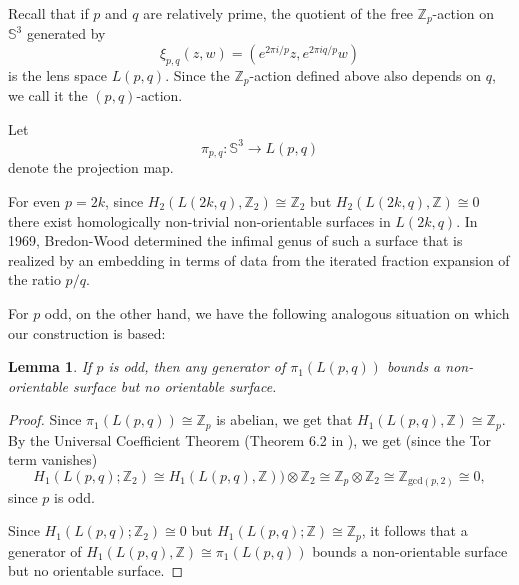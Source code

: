 \documentclass[11pt, reqno]{amsart}
\newtheorem{lemma}[thm]{Lemma}
\numberwithin{equation}{section}
\begin{document}
Recall that if $p$ and $q$ are relatively prime, the quotient of the free $\mathbb{Z}_p$-action on $\mathbb{S}^3$ generated by 
\begin{equation}
\xi_{p,q}(z,w)=(e^{2\pi i/p}z,e^{2\pi i q/p}w)
\end{equation}
is the lens space $L(p,q)$.  Since the $\mathbb{Z}_p$-action defined above also depends on $q$, we call it the $(p,q)$-action.

Let \begin{equation}\pi_{p,q}:\mathbb{S}^3\to L(p,q)\end{equation} denote the projection map.  

For even $p=2k$, since $H_2(L(2k,q),\mathbb{Z}_2)\cong\mathbb{Z}_2$ but $H_2(L(2k,q),\mathbb{Z})\cong 0$  there exist homologically non-trivial non-orientable surfaces in $L(2k,q)$.  In 1969, Bredon-Wood \cite{Bre} determined the infimal genus of such a surface that is realized by an embedding in terms of data from the iterated fraction expansion of the ratio $p/q$. 

For $p$ odd, on the other hand, we have the following analogous situation on which our construction is based:
\begin{lemma}\label{disc}
If $p$ is odd, then any generator of $\pi_1(L(p,q))$ bounds a non-orientable surface but no orientable surface. 
\end{lemma}
\begin{proof}
Since $\pi_1(L(p,q))\cong\mathbb{Z}_p$ is abelian, we get that $H_1(L(p,q),\mathbb{Z})\cong\mathbb{Z}_p$.  By the Universal Coefficient Theorem (Theorem 6.2 in \cite{Massey}), we get (since the Tor term vanishes) 
\begin{equation}
H_1(L(p,q);\mathbb{Z}_2)\cong H_1(L(p,q),\mathbb{Z}))\otimes\mathbb{Z}_2 \cong\mathbb{Z}_p\otimes\mathbb{Z}_2\cong\mathbb{Z}_{\mbox{gcd}(p,2)}\cong 0, 
\end{equation}
since $p$ is odd.

Since $H_1(L(p,q);\mathbb{Z}_2)\cong0$ but $H_1(L(p,q);\mathbb{Z})\cong\mathbb{Z}_p$, it follows that a generator of $H_1(L(p,q),\mathbb{Z})\cong\pi_1(L(p,q))$ bounds a non-orientable surface but no orientable surface.  
\end{proof}
\end{document}
